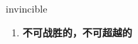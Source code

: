
\begin{frame}
{\huge invincible}
\begin{center}
\begin{enumerate}\Large
  \item \textbf{不可战胜的，不可超越的}
\end{enumerate}
\end{center}
\end{frame}
